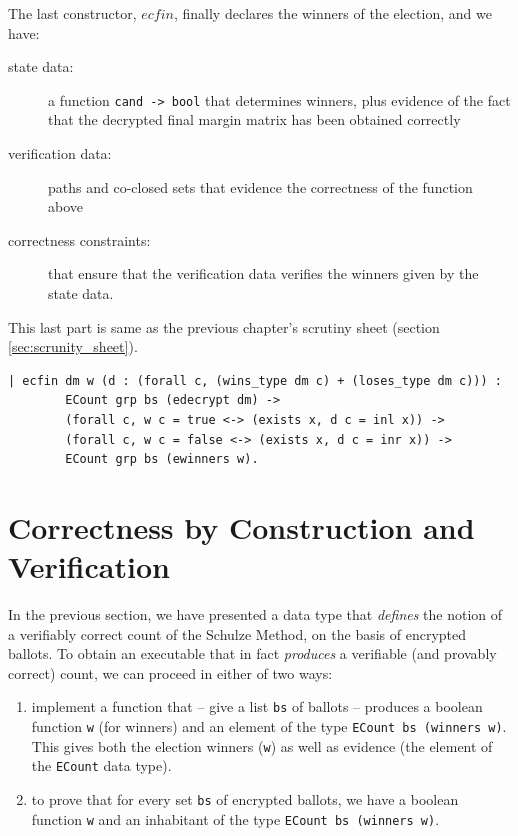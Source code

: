  
 
 \noindent
The last constructor, $ecfin$, finally declares the winners of the election,
and we have:
\begin{description}
  \item[state data:] a function \texttt{cand -> bool} that determines
  winners, plus evidence of the fact that the decrypted final margin
  matrix has been obtained correctly
  \item[verification data:] 
   paths and co-closed sets that evidence the correctness of the
   function above
 \item[correctness constraints:] that ensure that the verification
 data verifies the winners given by the state data.
\end{description}
This last part is same as the previous chapter's 
scrutiny sheet (section \ref{sec:scrunity_sheet}).

 \begin{lstlisting}[frame=single,basicstyle=\ttfamily\footnotesize]
  | ecfin dm w (d : (forall c, (wins_type dm c) + (loses_type dm c))) :
        ECount grp bs (edecrypt dm) ->
        (forall c, w c = true <-> (exists x, d c = inl x)) ->
        (forall c, w c = false <-> (exists x, d c = inr x)) ->
        ECount grp bs (ewinners w).  

\end{lstlisting}













\section{Correctness by Construction and Verification}
\label{sec:correct}

In the previous section, we have presented a data type that
\emph{defines} the notion of a verifiably correct count of the
Schulze Method, on the basis of encrypted ballots. To obtain an
executable that in fact \emph{produces} a verifiable (and provably
correct) count, we can proceed in either of two ways:
\begin{enumerate}
  \item implement a function that -- give a list \texttt{bs} of
  ballots -- produces a boolean function \texttt{w} (for winners) and an
  element of the type \texttt{ECount bs (winners w)}. This gives
  both the election winners (\texttt{w}) as well as evidence (the
  element of the \texttt{ECount} data type).
  \item to prove that for every set \texttt{bs} of encrypted
  ballots, we have a boolean function \texttt{w} and an inhabitant
  of the type \texttt{ECount bs (winners w)}.
\end{enumerate}

